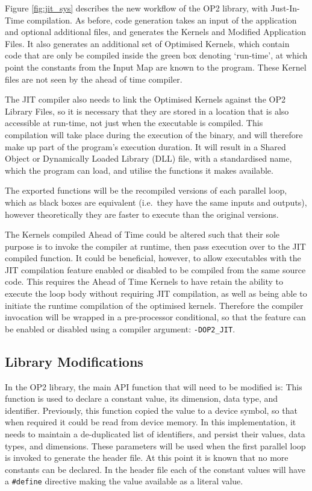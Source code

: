 Figure \ref{fig:jit_sys} describes the new workflow of the OP2 library, with Just-In-Time compilation. As before, code generation takes an input of the application and optional additional files, and generates the Kernels and Modified Application Files. It also generates an additional set of Optimised Kernels, which contain code that are only be compiled inside the green box denoting `run-time', at which point the constants from the Input Map are known to the program. These Kernel files are not seen by the ahead of time compiler.
\par
The JIT compiler also needs to link the Optimised Kernels against the OP2 Library Files, so it is necessary that they are stored in a location that is also accessible at run-time, not just when the executable is compiled. This compilation will take place during the execution of the binary, and will therefore make up part of the program's execution duration. It will result in a Shared Object or Dynamically Loaded Library (DLL) file, with a standardised name, which the program can load, and utilise the functions it makes available.
\par
The exported functions will be the recompiled versions of each parallel loop, which as black boxes are equivalent (i.e.\ they have the same inputs and outputs), however theoretically they are faster to execute than the original versions.
\par
The Kernels compiled Ahead of Time could be altered such that their sole purpose is to invoke the compiler at runtime, then pass execution over to the JIT compiled function. It could be beneficial, however, to allow executables with the JIT compilation feature enabled or disabled to be compiled from the same source code. This requires the Ahead of Time Kernels to have retain the ability to execute the loop body without requiring JIT compilation, as well as being able to initiate the runtime compilation of the optimised kernels. Therefore the compiler invocation will be wrapped in a pre-processor conditional, so that the feature can be enabled or disabled using a compiler argument: \verb|-DOP2_JIT|.

\subsection{Library Modifications}
In the OP2 library, the main API function that will need to be modified is:
\noindent This function is used to declare a constant value, its dimension, data type, and identifier.
Previously, this function copied the value to a device symbol, so that when required it could be read from device memory. In this implementation, it needs to maintain a de-duplicated list of identifiers, and persist their values, data types, and dimensions. These parameters will be used when the first parallel loop is invoked to generate the header file. At this point it is known that no more constants can be declared. In the header file each of the constant values will have a \verb|#define| directive making the value available as a literal value.

